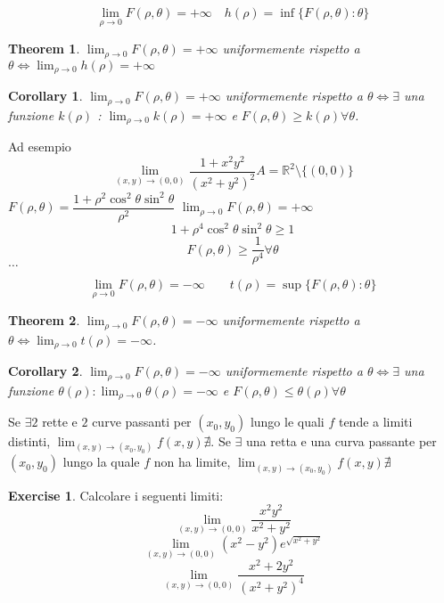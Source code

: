 \documentclass{article}
\theoremstyle{plain}
\newtheorem{thm}{Theorem}[section]
\newtheorem{cor}{Corollary}
\theoremstyle{definition}
\newtheorem{xca}[exmp]{Exercise}
\theoremstyle{remark}
\begin{document}
\[\lim_{\rho\to0}F(\rho,\theta)=+\infty \quad h(\rho)=\inf\{F(\rho,\theta):\theta\}\]
\begin{bxthm}
\begin{thm}
    $\lim_{\rho\to0}F(\rho,\theta)=+\infty$ uniformemente rispetto a $\theta \iff \lim_{\rho\to0}h(\rho)=+\infty$
\end{thm}
\end{bxthm}
\begin{bxthm}
\begin{cor}
    $\lim_{\rho\to0}F(\rho,\theta)=+\infty$ uniformemente rispetto a $\theta \iff \exists$ una funzione $k(\rho)$ : $\lim_{\rho\to0}k(\rho)=+\infty$ e $F(\rho,\theta)\geq k(\rho)\forall\theta$.
\end{cor}
\end{bxthm}

Ad esempio 
\[\lim_{(x,y)\to(0,0)}\dfrac{1+x^2y^2}{(x^2+y^2)^2} A=\mathbb{R}^2\setminus\{(0,0)\}\]
$F(\rho,\theta)=\dfrac{1+\rho^2\cos^2\theta\sin^2\theta}{\rho^2}$
$\lim_{\rho\to0}F(\rho,\theta)=+\infty$
\[1+\rho^4\cos^2\theta\sin^2\theta\geq1\]
\[F(\rho,\theta)\geq\dfrac{1}{\rho^4}\forall\theta\]
$\dots$


\[\lim_{\rho\to0}F(\rho,\theta)=-\infty\quad\quad t(\rho)=\sup\{F(\rho,\theta):\theta\}\]
\begin{bxthm}
\begin{thm}
    $\lim_{\rho\to0}F(\rho,\theta)=-\infty$ uniformemente rispetto a $\theta \iff \lim_{\rho\to0}t(\rho)=-\infty$.
\end{thm}
\end{bxthm}
\begin{bxthm}
\begin{cor}
    $\lim_{\rho\to0}F(\rho,\theta)=-\infty$ uniformemente rispetto a $\theta \iff \exists$ una funzione $\theta(\rho):\lim_{\rho\to0}\theta(\rho)=-\infty$ e $F(\rho,\theta)\leq\theta(\rho)\forall\theta$
\end{cor}
\end{bxthm}

Se $\exists 2$ rette e $2$ curve passanti per $(x_0,y_0)$ lungo le quali $f$ tende a limiti distinti, $\lim_{(x,y)\to(x_0,y_0)}f(x,y)\nexists$.
Se $\exists$ una retta e una curva passante per $(x_0,y_0)$ lungo la quale $f$ non ha limite, $\lim_{(x,y)\to(x_0,y_0)}f(x,y)\nexists$

\begin{xca}
Calcolare i seguenti limiti:
\[\lim_{(x,y)\to(0,0)}\dfrac{x^2y^2}{x^2+y^2}\]
\[\lim_{(x,y)\to(0,0)}(x^2-y^2)e^{\sqrt{x^2+y^2}}\]
\[\lim_{(x,y)\to(0,0)}\dfrac{x^2+2y^2}{(x^2+y^2)^4}\]
\end{xca}
\end{document}
